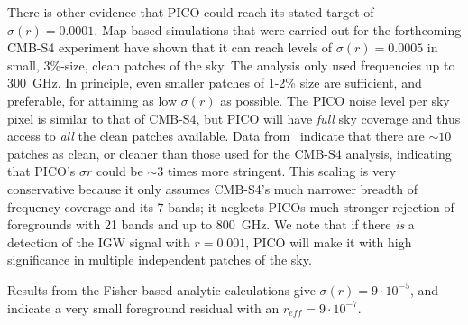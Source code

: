 \documentclass[PICOReport.tex]{subfiles}
\begin{document}
There is other evidence that PICO could reach its stated target of $\sigma(r) = 0.0001$. Map-based simulations that were carried out for the forthcoming CMB-S4 experiment have shown that it can reach levels of $\sigma(r) = 0.0005$ in small, 3\%-size, clean patches of the sky. The analysis only used frequencies up to 300~GHz. In principle, even smaller patches of 1-2\% size are sufficient, and preferable, for attaining as low $\sigma(r)$ as possible. The PICO noise level per sky pixel is similar to that of CMB-S4, but PICO will have {\it full} sky coverage and thus access to {\it all} the clean patches available. Data from \planck\ indicate that there are $\sim10$ %
patches as clean, or cleaner than those used for the CMB-S4 analysis, indicating that PICO's $\sigma{r}$ could be $\sim3$ times more stringent. This scaling is very conservative because it only assumes CMB-S4's much narrower breadth of frequency coverage and its 7 bands; %
it neglects PICOs much stronger rejection of foregrounds with 21 bands and up to 800~GHz.  We note that if there {\it is} a detection of the \ac{IGW} signal with $r=0.001$, PICO will make it with high significance in multiple independent patches of the sky. 

Results from the Fisher-based analytic calculations give $\sigma(r) = 9 \cdot 10^{-5}$, and indicate a very small foreground residual with an $r_{eff} = 9 \cdot 10^{-7}.$
\end{document}
